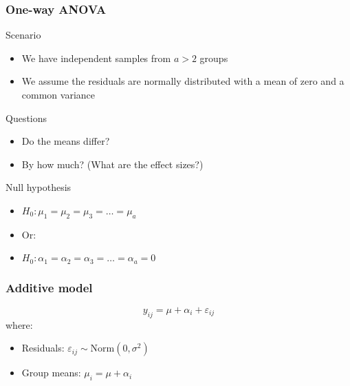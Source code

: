 \documentclass[color=usenames,dvipsnames]{beamer}\usepackage[]{graphicx}\usepackage[]{color}
\begin{document}
\begin{frame}
  \frametitle{One-way ANOVA}
  {\Large Scenario}
  \begin{itemize}
    \item We have independent samples from $a>2$ groups
    \item We assume the residuals are normally distributed with a mean of zero and a common variance
  \end{itemize}
  \pause
  \vfill
  {\Large Questions}
  \begin{itemize}
    \item Do the means differ?
    \item By how much? (What are the effect sizes?)
  \end{itemize}
  \pause
  \vfill
  {\Large Null hypothesis}
  \begin{itemize}
    \item $H_0: \mu_1 = \mu_2 = \mu_3 = \ldots = \mu_a$
    \item Or:
    \item $H_0: \alpha_1 = \alpha_2 = \alpha_3 = \ldots = \alpha_a = 0$
  \end{itemize}
\end{frame}





\begin{frame}
  \frametitle{Additive model}
  \Large
  \[
    y_{ij} = \mu + \alpha_i + \varepsilon_{ij}
  \]
  \large
  \vfill
  where:
  \begin{itemize}
    \item Residuals: $\varepsilon_{ij} \sim \mathrm{Norm}(0, \sigma^2)$
    \item Group means: $\mu_i = \mu + \alpha_i$
  \end{itemize}
\end{frame}




\end{document}
